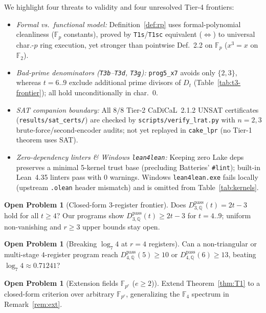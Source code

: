 \documentclass[11pt,reqno]{amsart}
\theoremstyle{definition}
\newtheorem{openproblem}[theorem]{Open Problem}
\newcommand{\F}{\mathbb{F}}
\newcommand{\Q}{\mathbb{Q}}
\newcommand{\pass}{\mathrm{pass}}
\begin{document}
We highlight four threats to validity and four unresolved Tier-4 frontiers:
\begin{itemize}
  \item \emph{Formal vs.\ functional model:} Definition~\ref{def:rp} uses formal-polynomial cleanliness ($\F_p$ constants), proved by \texttt{T1s}/\texttt{T1sc} equivalent ($\Leftrightarrow$) to universal char.-$p$ ring execution, yet stronger than pointwise Def.~2.2 on $\F_p$ ($x^3 = x$ on $\F_2$).
  \item \emph{Bad-prime denominators (\texttt{T3b}--\texttt{T3d}, \texttt{T3g}):} \texttt{prog5\_x7} avoids only $\{2, 3\}$, whereas $t = 6..9$ exclude additional prime divisors of $D_t$ (Table~\ref{tab:t3-frontier}); all hold unconditionally in char.~$0$.
  \item \emph{SAT companion boundary:} All $8/8$ Tier-2 CaDiCaL~2.1.2 UNSAT certificates (\texttt{results/\allowbreak sat\_\allowbreak certs/}) are checked by \texttt{scripts/\allowbreak verify\_\allowbreak lrat.py} with $n = 2, 3$ brute-force/second-encoder audits; not yet replayed in \texttt{cake\_lpr} (no Tier-1 theorem uses SAT).
  \item \emph{Zero-dependency linters \& Windows \texttt{lean4lean}:} Keeping zero Lake deps preserves a minimal 5-kernel trust base (precluding Batteries' \texttt{\#lint}); built-in Lean~4.35 linters pass with 0 warnings. Windows \texttt{lean4lean.exe} fails locally (upstream \texttt{.olean} header mismatch) and is omitted from Table~\ref{tab:kernels}.
\end{itemize}

\begin{openproblem}[Closed-form $3$-register frontier]
Does $D_{3,\Q}^{\pass}(t) = 2t - 3$ hold for all $t \ge 4$?
Our programs show $D_{3,\Q}^{\pass}(t) \ge 2t - 3$ for $t = 4..9$; uniform non-vanishing and $r \ge 3$ upper bounds stay open.
\end{openproblem}

\begin{openproblem}[Breaking $\log_7 4$ at $r = 4$ registers]
\label{op:r4}
Can a non-triangular or multi-stage $4$-register program reach $D_{4,\Q}^{\pass}(5) \ge 10$ or $D_{4,\Q}^{\pass}(6) \ge 13$, beating $\log_7 4 \approx 0.71241$?
\end{openproblem}

\begin{openproblem}[Extension fields $\F_{p^e}$ ($e \ge 2$)]
Extend Theorem~\ref{thm:T1} to a closed-form criterion over arbitrary $\F_{p^e}$, generalizing the $\F_4$ spectrum in Remark~\ref{rem:ext}.
\end{openproblem}
\end{document}
